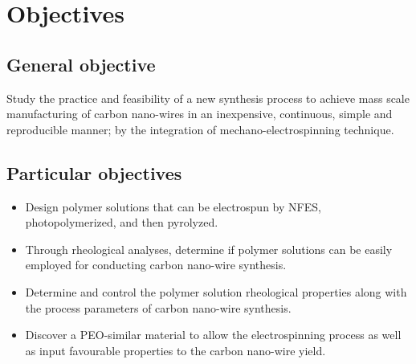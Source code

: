 
\chapter{Objectives} %

\label{Chapter:Objectives}


\section{General objective}
Study the practice and feasibility of a new synthesis process to achieve mass scale manufacturing of carbon nano-wires in an inexpensive, continuous, simple and reproducible manner; by the integration of mechano-electrospinning technique.

\section{Particular objectives}

\begin{itemize}
	\item{
	Design polymer solutions that can be electrospun by NFES, photopolymerized, and then pyrolyzed.
    }
    \item{
    Through rheological analyses, determine if polymer solutions can be easily employed for conducting carbon nano-wire synthesis.
    }
    \item{
    Determine and control the polymer solution rheological properties along with the process parameters of carbon nano-wire synthesis.
    }
    \item{
    Discover a PEO-similar material to allow the electrospinning process as well as input favourable properties to the carbon nano-wire yield.
    }
\end{itemize}




